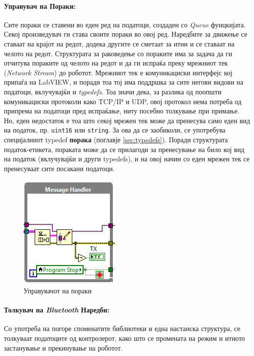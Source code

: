 \documentclass[12pt]{article}
\begin{document}
    \bigbreak

    \paragraph{Управувач на Пораки:\\} %
      \label{sec:message_handler}
      Сите пораки се ставени во еден ред на податоци, создаден со \textit{Queue} фунцкијата. Секој произведувач ги става своите пораки во овој ред. Наредбите за движење се ставаат на крајот на редот, додека другите се сметаат за итни и се ставаат на челото на редот. Структурата за раковедење со пораките има за задача да ги отчитува пораките од челото на редот и да ги испраќа преку мрежниот тек (\textit{Network Stream}) до роботот. Мрежниот тек е комуникациски интерфејс кој припаѓа на LabVIEW, и поради тоа тој има поддршка за сите негови видови на податоци, вклучувајќи и \textit{typedefs}. Тоа значи дека, за разлика од поопшти комуникациски протоколи како TCP/IP и UDP, овој протокол нема потреба од припрема на податоци пред испраќање, ниту посебно толкување при примање. Но, еден недостаток е тоа што секој мрежен тек може да пренесува само еден вид на податок, пр. \verb+uint16+ или \verb+string+. За ова да се заобиколи, се употребува специјалниот typedef \textbf{порака} (поглавје \ref{sec:typedefs}). Поради структурата податок-етикета, пораката може да се прилагоди за пренесување на било кој вид на податок (вклучувајќи и други typedefs), и на овој начин со еден мрежен тек се пренесуваат сите посакани податоци.
      \begin{figure}[H]
        \centering
        \includegraphics[width=0.35\linewidth]{./images/message_handler.png}
        \caption{Управувачот на пораки}
        \end{figure}

    \paragraph{Толкувач на \textit{Bluetooth} Наредби:\\}
      Со употреба на погоре споменатите библиотеки и една настанска структура, се толкуваат податоците од контролерот, како што се промената на режим и итното застанување и прекинување на роботот.
\end{document}
